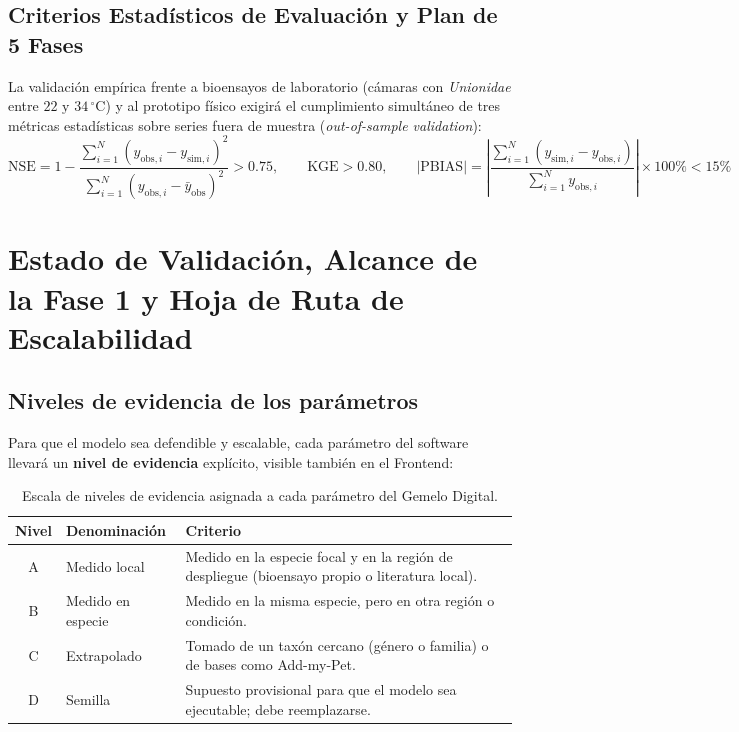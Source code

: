 \documentclass[11pt,letterpaper]{article}
\begin{document}
\subsection{Criterios Estadísticos de Evaluación y Plan de 5 Fases}
La validación empírica frente a bioensayos de laboratorio (cámaras con \textit{Unionidae} entre $22\text{ y }34\,^\circ\text{C}$) y al prototipo físico exigirá el cumplimiento simultáneo de tres métricas estadísticas sobre series fuera de muestra (\textit{out-of-sample validation}):
\begin{equation}
\text{NSE} = 1 - \frac{\sum_{i=1}^N \left(y_{\text{obs},i} - y_{\text{sim},i}\right)^2}{\sum_{i=1}^N \left(y_{\text{obs},i} - \bar{y}_{\text{obs}}\right)^2} > 0.75, \qquad \text{KGE} > 0.80, \qquad |\text{PBIAS}| = \left|\frac{\sum_{i=1}^N \left(y_{\text{sim},i} - y_{\text{obs},i}\right)}{\sum_{i=1}^N y_{\text{obs},i}}\right|\times 100\% < 15\%
\end{equation}

\newpage
\section{Estado de Validación, Alcance de la Fase 1 y Hoja de Ruta de Escalabilidad}
\label{sec:estado}

\subsection{Niveles de evidencia de los parámetros}
Para que el modelo sea defendible y escalable, cada parámetro del software llevará un \textbf{nivel de evidencia} explícito, visible también en el Frontend:

\begin{table}[htbp]
\centering
\caption{Escala de niveles de evidencia asignada a cada parámetro del Gemelo Digital.}
\label{tab:evidencia}
\vspace{0.15cm}
\small
\begin{tabularx}{\textwidth}{c l X}
\hline
\textbf{Nivel} & \textbf{Denominación} & \textbf{Criterio} \\
\hline
A & Medido local & Medido en la especie focal y en la región de despliegue (bioensayo propio o literatura local). \\
B & Medido en especie & Medido en la misma especie, pero en otra región o condición. \\
C & Extrapolado & Tomado de un taxón cercano (género o familia) o de bases como Add-my-Pet. \\
D & Semilla & Supuesto provisional para que el modelo sea ejecutable; debe reemplazarse. \\
\hline
\end{tabularx}
\end{table}
\end{document}
